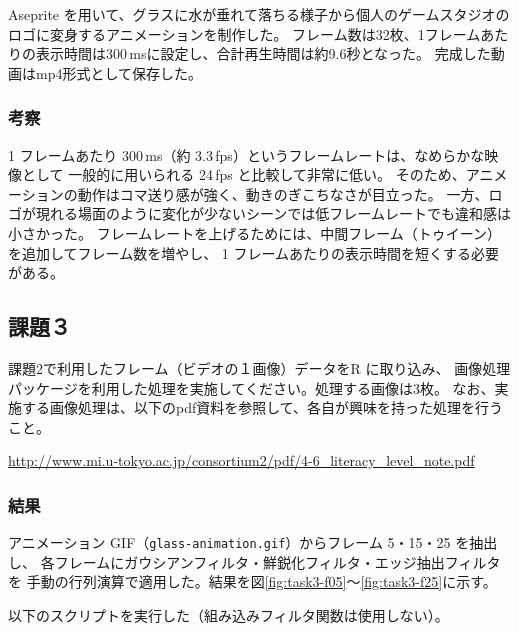 \documentclass[12pt,a4paper]{ltjsarticle}
\begin{document}
  Aseprite を用いて、グラスに水が垂れて落ちる様子から個人のゲームスタジオのロゴに変身するアニメーションを制作した。
  フレーム数は32枚、1フレームあたりの表示時間は300\,msに設定し、合計再生時間は約9.6秒となった。
  完成した動画はmp4形式として保存した。

  \subsubsection{考察}\label{subsubsec:task2-explanation}

  1 フレームあたり 300\,ms（約 3.3\,fps）というフレームレートは、なめらかな映像として
  一般的に用いられる 24\,fps と比較して非常に低い。
  そのため、アニメーションの動作はコマ送り感が強く、動きのぎこちなさが目立った。
  一方、ロゴが現れる場面のように変化が少ないシーンでは低フレームレートでも違和感は小さかった。
  フレームレートを上げるためには、中間フレーム（トゥイーン）を追加してフレーム数を増やし、
  1 フレームあたりの表示時間を短くする必要がある。

\subsection{課題３}\label{subsec:task3}
  課題2で利用したフレーム（ビデオの１画像）データをR に取り込み、
  画像処理パッケージを利用した処理を実施してください。処理する画像は3枚。
  なお、実施する画像処理は、以下のpdf資料を参照して、各自が興味を持った処理を行うこと。

  \url{http://www.mi.u-tokyo.ac.jp/consortium2/pdf/4-6_literacy_level_note.pdf}

  \subsubsection{結果}\label{subsubsec:task3-result}

  アニメーション GIF（\texttt{glass-animation.gif}）からフレーム 5・15・25 を抽出し、
  各フレームにガウシアンフィルタ・鮮鋭化フィルタ・エッジ抽出フィルタを
  手動の行列演算で適用した。結果を図\ref{fig:task3-f05}〜\ref{fig:task3-f25}に示す。

  以下のスクリプトを実行した（組み込みフィルタ関数は使用しない）。


\end{document}
